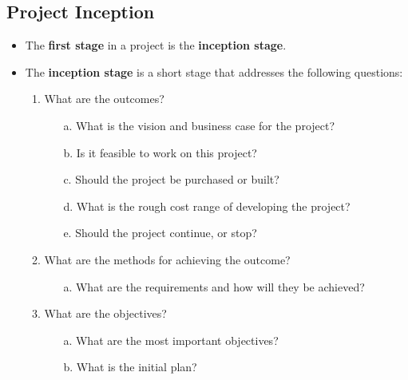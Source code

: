 \documentclass[16pt]{article}
\begin{document}
    \subsection*{Project Inception}
    \begin{itemize}
        \item The \textbf{first stage} in a project is the \textbf{inception stage}.
        \item The \textbf{inception stage} is a short stage that addresses the following questions:
        \begin{enumerate}
            \item What are the outcomes?
            \begin{itemize}
                \item[a.] What is the vision and business case for the project?
                \item[b.] Is it feasible to work on this project? 
                \item[c.] Should the project be purchased or built?
                \item[d.] What is the rough cost range of developing the project?  
                \item[e.] Should the project continue, or stop? 
            \end{itemize}
            \item What are the methods for achieving the outcome?
            \begin{itemize}
                \item[a.] What are the requirements and how will they be achieved?
            \end{itemize}
            \item What are the objectives?
            \begin{itemize}
                \item[a.] What are the most important objectives?
                \item[b.] What is the initial plan?
            \end{itemize}
        \end{enumerate}
    \end{itemize}
\end{document}

